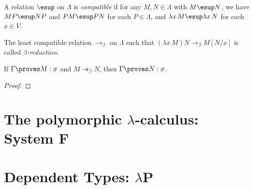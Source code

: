 \documentclass[reqno]{amsart}
\begin{document}
    \begin{definition}
        A relation $\esup$ on $\Lambda$ is \textit{compatible} if for any $M,N\in\Lambda$ with $M\esup N$, we have $MP\esup NP$ and $PM\esup PN$ for each $P\in\Lambda$, and $\lambda x\,M\esup\lambda x\,N$ for each $x\in V$.

        The least compatible relation $\rightarrow_\beta$ on $\Lambda$ such that $(\lambda x\,M)N\rightarrow_\beta M[N/x]$ is called \textit{$\beta$-reduction}.
    \end{definition}

    \begin{notation}
        
    \end{notation}

    \begin{theorem}
        If $\Gamma\proves M:\sigma$ and $M\twoheadrightarrow_\beta N$, then $\Gamma\proves N:\sigma$.
    \end{theorem}
    \begin{proof}
        
    \end{proof}

    \section{The polymorphic $\lambda$-calculus: System $\mathbf{F}$}

    \begin{definition}
        
    \end{definition}

    \begin{lemma}
        
    \end{lemma}

    \begin{theorem}

    \end{theorem}

    \section{Dependent Types: $\lambda\mathbf{P}$}

    \begin{definition}
        
    \end{definition}
\end{document}
